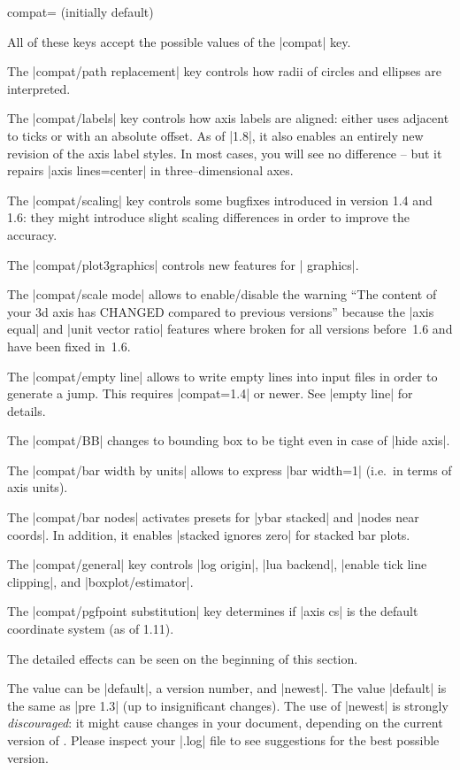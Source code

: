\begin{pgfplotskey}{compat= (initially default)}
\begin{pgfplotskeylist}
	All of these keys accept the possible values of the |compat| key.

	The |compat/path replacement| key controls how radii of circles and ellipses are interpreted.

	The |compat/labels| key controls how axis labels are aligned: either uses adjacent to ticks or with an absolute offset. As of |1.8|, it also enables an entirely new revision of the axis label styles. In most cases, you will see no difference -- but it repairs |axis lines=center| in three--dimensional axes.

	The |compat/scaling| key controls some bugfixes introduced in version 1.4 and 1.6: they might introduce slight scaling differences in order to improve the accuracy.

	The |compat/plot3graphics| controls new features for | graphics|.

	The |compat/scale mode| allows to enable/disable the warning ``The content of your 3d axis has CHANGED compared to previous versions'' because the |axis equal| and |unit vector ratio| features where broken for all versions before~1.6 and have been fixed in~1.6.

	The |compat/empty line| allows to write empty lines into input files in order to generate a jump. This requires |compat=1.4| or newer. See |empty line| for details.

	The |compat/BB| changes to bounding box to be tight even in case of |hide axis|.

	The |compat/bar width by units| allows to express |bar width=1| (i.e.\ in terms of axis units).

	The |compat/bar nodes| activates presets for |ybar stacked| and |nodes near coords|. In addition, it enables |stacked ignores zero| for stacked bar plots.

	The |compat/general| key controls |log origin|, |lua backend|, |enable tick line clipping|, and |boxplot/estimator|.

	The |compat/pgfpoint substitution| key determines if |axis cs| is the default coordinate system (as of 1.11).

	The detailed effects can be seen on the beginning of this section.
	\end{pgfplotskeylist}

	The value  can be |default|, a version number, and |newest|. The value |default| is the same as |pre 1.3| (up to insignificant changes). The use of |newest| is strongly \emph{discouraged}: it might cause changes in your document, depending on the current version of \PGFPlots. Please inspect your |.log| file to see suggestions for the best possible version.
\end{pgfplotskey}

